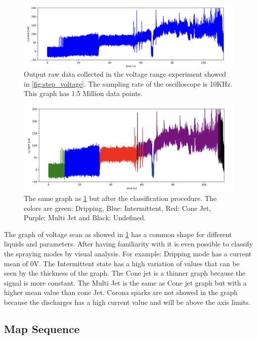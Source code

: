 \begin{figure}[H]
    \center
    \includegraphics[width=12cm]{Figuras/19:03/raw-data-example.png}
    \caption{Output raw data collected in the voltage range experiment showed in \ref{fig:step_voltage}. The sampling rate of the oscilloscope is 10KHz. This graph has 1.5 Million data points.}
    \label{fig:raw_data}
\end{figure}

\begin{figure}[H]
    \center
    \includegraphics[width=12cm]{Figuras/19:03/classified-data-example.png}
    \caption{The same graph as \ref{fig:raw_data} but after the classification procedure. The colors are green: Dripping, Blue: Intermittent, Red: Cone Jet, Purple: Multi Jet and Black: Undefined.}
    \label{fig:class_step_data}
\end{figure}

The graph of voltage scan as showed in \ref{fig:raw_data} has a common shape for different liquids and parameters. After having familiarity with it is even possible to classify the spraying modes by visual analysis. For example: 
Dripping mode has a current mean of 0V. The Intermittent state has a high variation of values that can be seen by the thickness of the graph. The Cone jet is a thinner graph because the signal is more constant. The Multi Jet is the same as Cone jet graph but with a higher mean value than cone Jet. Corona sparks are not showed in the graph because the discharges has a high current value and will be above the axis limits.



\subsection{Map Sequence}
\label{subsec:map_results}

